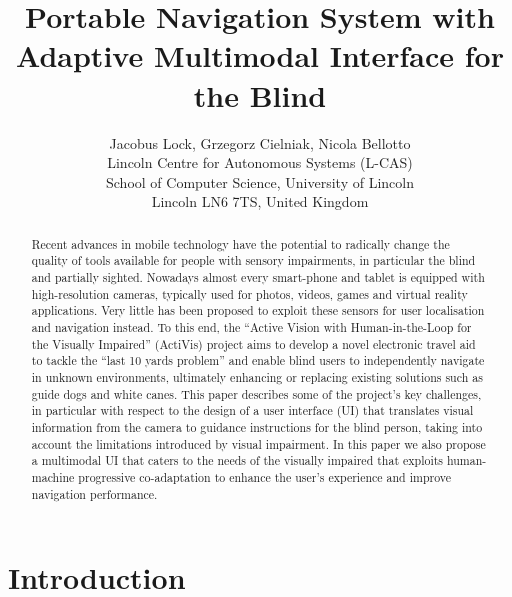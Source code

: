 \documentclass[letterpaper]{article}
\newcommand{\papertitle}{Portable Navigation System with Adaptive Multimodal Interface for the Blind}
\begin{document}
%
\title{\papertitle}
\author{Jacobus Lock, Grzegorz Cielniak, Nicola Bellotto\\
Lincoln Centre for Autonomous Systems (L-CAS)\\
School of Computer Science, University of Lincoln\\
Lincoln LN6 7TS, United Kingdom\\
}
\maketitle

\begin{abstract}

Recent advances in mobile technology have the potential to radically change the quality of tools available for people with sensory impairments, in particular the blind and partially sighted. Nowadays almost every smart-phone and tablet is equipped with high-resolution cameras, typically used for photos, videos, games and virtual reality applications. Very little has been proposed to exploit these sensors for user localisation and navigation instead. To this end, the ``Active Vision with Human-in-the-Loop for the Visually Impaired'' (ActiVis) project aims to develop a novel electronic travel aid to tackle the ``last 10 yards problem'' and enable blind users to independently navigate in unknown environments, ultimately enhancing or replacing existing solutions such as guide dogs and white canes. This paper describes some of the project's key challenges, in particular with respect to the design of a user interface (UI) that translates visual information from the camera to guidance instructions for the blind person, taking into account the limitations introduced by visual impairment. In this paper we also propose a multimodal UI that caters to the needs of the visually impaired that exploits human-machine progressive co-adaptation to enhance the user's experience and improve navigation performance.

\end{abstract}

\section{Introduction}
\end{document}
